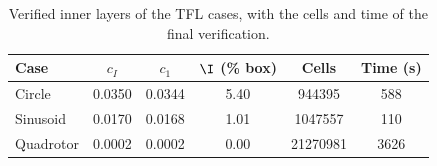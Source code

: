 \begin{table}[ht]
\centering\small
\caption{Verified inner layers of the TFL cases, with the cells and time of the final verification.}
\label{tab:inner}
\begin{tabular}{lccccc}
\toprule
Case & $c_I$ & $c_1$ & $\I$ (\% box) & Cells & Time (s)\\
\midrule
Circle & 0.0350 & 0.0344 & 5.40 & 944395 & 588\\
Sinusoid & 0.0170 & 0.0168 & 1.01 & 1047557 & 110\\
Quadrotor & 0.0002 & 0.0002 & 0.00 & 21270981 & 3626\\
\bottomrule
\end{tabular}
\end{table}
